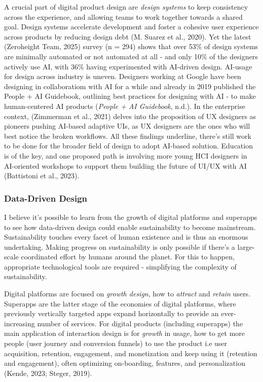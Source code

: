 \documentclass[
  12pt,
  letterpaper,
  DIV=11,
  numbers=noendperiod]{scrartcl}
\begin{document}
A crucial part of digital product design are \emph{design systems} to
keep consistency across the experience, and allowing teams to work
together towards a shared goal. Design systems accelerate development
and foster a cohesive user experience across products by reducing design
debt (M. Suarez et al., 2020). Yet the latest (Zeroheight Team, 2025)
survey (n = 294) shows that over 53\% of design systems are minimally
automated or not automated at all - and only 10\% of the designers
actively use AI, with 36\% having experimented with AI-driven design.
AI-usage for design across industry is uneven. Designers working at
Google have been designing in collaboratiom with AI for a while and
already in 2019 published the People + AI Guidebook, outlining best
practices for designing with AI - to make human-centered AI products
(\emph{People + {AI Guidebook}}, n.d.). In the enterprise context,
(Zimmerman et al., 2021) delves into the proposition of UX designers as
pioneers pushing AI-based adaptive UIs, as UX designers are the ones who
will best notice the broken workflows. All these findings underline,
there's still work to be done for the broader field of design to adopt
AI-based solution. Education is of the key, and one proposed path is
involving more young HCI designers in AI-oriented workshops to support
them building the future of UI/UX with AI (Battistoni et al., 2023).

\subsubsection{Data-Driven Design}\label{data-driven-design}

I believe it's possible to learn from the growth of digital platforms
and superapps to see how data-driven design could enable sustainability
to become mainstream. Sustainability touches every facet of human
existence and is thus an enormous undertaking. Making progress on
sustainability is only possible if there's a large-scale coordinated
effort by humans around the planet. For this to happen, appropriate
technological tools are required - simplifying the complexity of
sustainability.

Digital platforms are focused on \emph{growth design}, how to
\emph{attract} and \emph{retain} users. Superapps are the latter stage
of the economies of digital platforms, where previously vertically
targeted apps expand horizontally to provide an ever-increasing number
of services. For digital products (including superapps) the main
application of interaction design is for \emph{growth} in usage, how to
get more people (user journey and conversion funnels) to use the product
i.e user acquisition, retention, engagement, and monetization and keep
using it (retention and engagement), often optimizing on-boarding,
features, and personalization (Kende, 2023; Steger, 2019).
\end{document}
